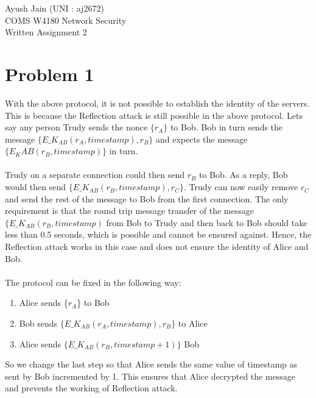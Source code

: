 \documentclass[10pt]{article}
\begin{document}
\vspace*{\fill}
\begin{Huge}
\begin{center}
Ayush Jain (UNI : aj2672)\\
COMS W4180 Network Security\\
Written Assignment 2\\
\end{center}
\end{Huge}
\vspace*{\fill}
\newpage
\section{Problem 1}
With the above protocol, it is not possible to establish the identity of the servers. This is because the Reflection attack is still possible in the above protocol. Lets say any person Trudy sends the nonce $\{r_A\}$ to Bob. Bob in turn sends the message  $\{E\_K_{AB}(r_A, timestamp), r_B\}$ and expects the message  $\{E_KAB(r_B, timestamp)\}$ in turn.\\\\
Trudy on a separate connection could then send ${r_B}$ to Bob. As a reply, Bob would then send $\{E\_K_{AB}(r_B, timestamp), r_C\}$. Trudy can now easily remove $r_C$ and send the rest of the message to Bob from the first connection. The only requirement is that the round trip message transfer of the message $\{E\_K_{AB}(r_B, timestamp)$ from Bob to Trudy and then back to Bob should take less than 0.5 seconds, which is possible and cannot be ensured against. Hence, the Reflection attack works in this case and does not ensure the identity of Alice and Bob.\\\\
The protocol can be fixed in the following way:
\begin{enumerate}
\item Alice sends \{$r_A$\} to Bob
\item Bob sends $\{E\_K_{AB}(r_A, timestamp), r_B\}$ to Alice
\item Alice sends $\{E\_K_{AB}(r_B, timestamp+1)\}$ Bob 
\end{enumerate}
So we change the last step so that Alice sends the same value of timestamp as sent by Bob incremented by 1. This ensures that Alice decrypted the message and prevents the working of Reflection attack.\\
\end{document}
